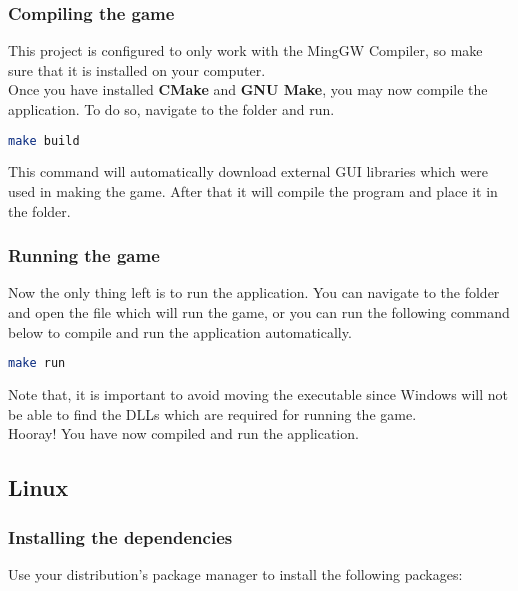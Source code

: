 \subsubsection{Compiling the game}

This project is configured to only work with
the MingGW Compiler, so make sure that it is installed on your computer.\\

Once you have installed \textbf{CMake} and \textbf{GNU Make}, you may now
compile the application. To do so, navigate to the 
folder and run.
 
\begin{lstlisting}[language=bash]
make build
\end{lstlisting}

This command will automatically download external GUI libraries which were used
in making the game. After that it will compile the program and place it in the
 folder.

\subsubsection{Running the game}

Now the only thing left is to run the application. You can navigate to the 
folder and open the  file which will run the game, or you
can run the following command below to compile and run the application automatically.

\begin{lstlisting}[language=bash]
make run
\end{lstlisting}

Note that, it is important to avoid moving the executable since Windows will not
be able to find the DLLs which are required for running the game.\\

Hooray! You have now compiled and run the application.

\subsection{Linux}

\subsubsection{Installing the dependencies}

Use your distribution’s package manager to install the following packages:

